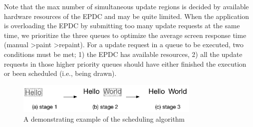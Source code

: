 \documentclass[]{sigchi}
\begin{document}
Note that the max number of simultaneous update regions is decided by available hardware resources of the EPDC and may be quite limited. When the application is overloading the EPDC by submitting too many update requests at the same time, we prioritize the three queues to optimize the average screen response time (manual \textgreater paint \textgreater repaint).
For a update request in a queue to be executed, two conditions must be met; 1) the EPDC has available resources, 2) all the update requests in those higher priority queues should have either finished the execution or been scheduled (i.e., being drawn).



\begin{figure}[t]
\begin{center}
\includegraphics[width=0.8\textwidth]{figures/helloworld}
\caption{A demonstrating example of the scheduling algorithm}
\label{fig:drawing}
\end{center}
\end{figure}







\end{document}
